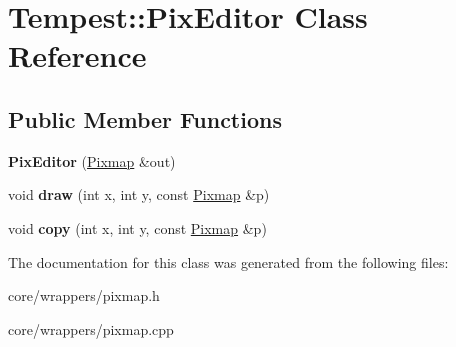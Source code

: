 \hypertarget{class_tempest_1_1_pix_editor}{\section{Tempest\+:\+:Pix\+Editor Class Reference}
\label{class_tempest_1_1_pix_editor}
}
\subsection*{Public Member Functions}
\begin{DoxyCompactItemize}
\item 
\hypertarget{class_tempest_1_1_pix_editor_a17212f908350fcf7bea360491ea63225}{{\bfseries Pix\+Editor} (\hyperlink{class_tempest_1_1_pixmap}{Pixmap} \&out)}\label{class_tempest_1_1_pix_editor_a17212f908350fcf7bea360491ea63225}

\item 
\hypertarget{class_tempest_1_1_pix_editor_a4c6f6aa7b61ae4fb039415c9d7ca3ac1}{void {\bfseries draw} (int x, int y, const \hyperlink{class_tempest_1_1_pixmap}{Pixmap} \&p)}\label{class_tempest_1_1_pix_editor_a4c6f6aa7b61ae4fb039415c9d7ca3ac1}

\item 
\hypertarget{class_tempest_1_1_pix_editor_ad75184f77403d41455a882595f69a4c8}{void {\bfseries copy} (int x, int y, const \hyperlink{class_tempest_1_1_pixmap}{Pixmap} \&p)}\label{class_tempest_1_1_pix_editor_ad75184f77403d41455a882595f69a4c8}

\end{DoxyCompactItemize}


The documentation for this class was generated from the following files\+:\begin{DoxyCompactItemize}
\item 
core/wrappers/pixmap.\+h\item 
core/wrappers/pixmap.\+cpp\end{DoxyCompactItemize}
